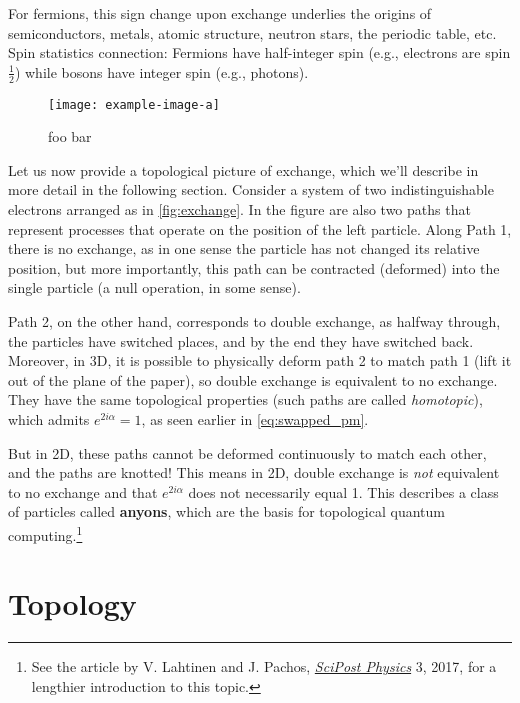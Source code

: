 \documentclass[12pt, english]{book}
\begin{document}
For fermions, this sign change upon exchange underlies the origins of semiconductors, metals, atomic structure, neutron stars, the periodic table, etc.
Spin statistics connection: Fermions have half-integer spin (e.g., electrons are spin $\frac{1}{2}$) while bosons have integer spin (e.g., photons).

\begin{figure}[!ht]
	\centering 
	\texttt{[image: example-image-a]}
	\caption{foo bar}
	\label{fig:exchange}
\end{figure}

Let us now provide a topological picture of exchange, which we'll describe in more detail in the following section.
Consider a system of two indistinguishable electrons arranged as in \autoref{fig:exchange}.
In the figure are also two paths that represent processes that operate on the position of the left particle.
Along Path 1, there is no exchange, as in one sense the particle has not changed its relative position, but more importantly, this path can be contracted (deformed) into the single particle (a null operation, in some sense).

Path 2, on the other hand, corresponds to double exchange, as halfway through, the particles have switched places, and by the end they have switched back.
Moreover, in 3D, it is possible to physically deform path 2 to match path 1 (lift it out of the plane of the paper), so double exchange is equivalent to no exchange.
They have the same topological properties (such paths are called \emph{homotopic}), which admits $e^{2 i \alpha} = 1$, as seen earlier in \autoref{eq:swapped_pm}.

But in 2D, these paths cannot be deformed continuously to match each other, and the paths are knotted!
This means in 2D, double exchange is \emph{not} equivalent to no exchange and that $e^{2 i \alpha}$ does not necessarily equal 1.
This describes a class of particles called \textbf{anyons}, which are the basis for topological quantum computing.\footnote{See the article by V. Lahtinen and J. Pachos, \href{https://arxiv.org/abs/1705.04103}{\emph{SciPost Physics}} 3, 2017, for a lengthier introduction to this topic.}



\section{Topology}
\end{document}
